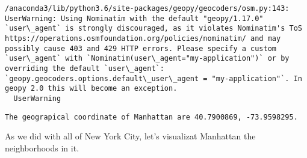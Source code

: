 \documentclass[11pt]{article}
\begin{document}
    \begin{Verbatim}[commandchars=\\\{\}]
/anaconda3/lib/python3.6/site-packages/geopy/geocoders/osm.py:143: UserWarning: Using Nominatim with the default "geopy/1.17.0" `user\_agent` is strongly discouraged, as it violates Nominatim's ToS https://operations.osmfoundation.org/policies/nominatim/ and may possibly cause 403 and 429 HTTP errors. Please specify a custom `user\_agent` with `Nominatim(user\_agent="my-application")` or by overriding the default `user\_agent`: `geopy.geocoders.options.default\_user\_agent = "my-application"`. In geopy 2.0 this will become an exception.
  UserWarning

    \end{Verbatim}

    \begin{Verbatim}[commandchars=\\\{\}]
The geograpical coordinate of Manhattan are 40.7900869, -73.9598295.

    \end{Verbatim}

    As we did with all of New York City, let's visualizat Manhattan the
neighborhoods in it.
\end{document}
